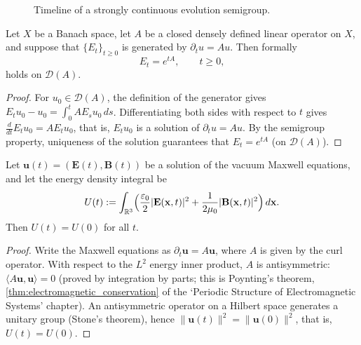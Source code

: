 \begin{figure}[htbp]
\centering
{}
\caption{Timeline of a strongly continuous evolution semigroup.}
\label{fig:evolution_semigroup}
\end{figure}

\begin{theorem}\label{thm:linear_evolution_exponential}
Let $X$ be a Banach space, let $A$ be a closed densely defined linear operator on $X$, and suppose that $\{E_t\}_{t\ge 0}$ is generated by $\partial_t u = Au$. Then formally
\[
E_t = e^{tA}, \qquad t\ge 0,
\]
holds on $\mathcal{D}(A)$.
\end{theorem}

\begin{proof}
For $u_0\in\mathcal{D}(A)$, the definition of the generator gives $E_t u_0 - u_0 = \int_0^t AE_s u_0\,ds$. Differentiating both sides with respect to $t$ gives $\frac{d}{dt}E_t u_0 = AE_t u_0$, that is, $E_t u_0$ is a solution of $\partial_t u = Au$. By the semigroup property, uniqueness of the solution guarantees that $E_t = e^{tA}$ (on $\mathcal{D}(A)$).
\end{proof}

\begin{theorem}\label{thm:vacuum_energy_conservation}
Let $\mathbf{u}(t) = (\mathbf{E}(t),\mathbf{B}(t))$ be a solution of the vacuum Maxwell equations, and let the energy density integral be
\[
U(t) := \int_{\mathbb{R}^3}\Bigl(\frac{\varepsilon_0}{2}|\mathbf{E}(\mathbf{x},t)|^2 + \frac{1}{2\mu_0}|\mathbf{B}(\mathbf{x},t)|^2\Bigr)\,d\mathbf{x}.
\]
Then $U(t) = U(0)$ for all $t$.
\end{theorem}

\begin{proof}
Write the Maxwell equations as $\partial_t\mathbf{u} = A\mathbf{u}$, where $A$ is given by the curl operator. With respect to the $L^2$ energy inner product, $A$ is antisymmetric: $\langle A\mathbf{u},\mathbf{u}\rangle = 0$ (proved by integration by parts; this is Poynting's theorem, \cref{thm:electromagnetic_conservation} of the `Periodic Structure of Electromagnetic Systems' chapter). An antisymmetric operator on a Hilbert space generates a unitary group (Stone's theorem), hence $\|\mathbf{u}(t)\|^2 = \|\mathbf{u}(0)\|^2$, that is, $U(t)=U(0)$.
\end{proof}

